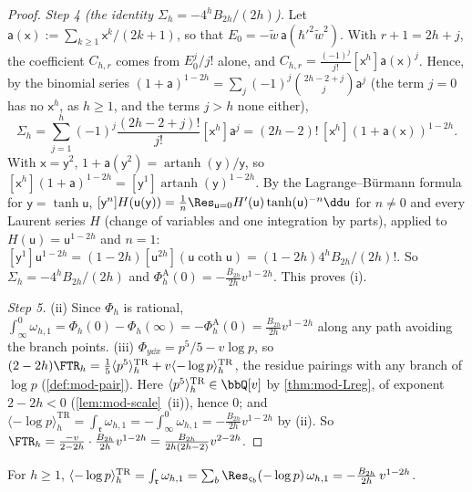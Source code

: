 \begin{proof}
\emph{Step 4 (the identity $\Sigma_h=-4^hB_{2h}/(2h)$).} Let $\mathsf a(\mathsf x):=\sum_{k\geq 1}\mathsf x^k/(2k+1)$, so that $E_0=-\tilde w\,\mathsf a(\hbar'^2\tilde w^2)$. With $r+1=2h+j$, the coefficient $C_{h,r}$ comes from $E_0^j/j!$ alone, and $C_{h,r}=\frac{(-1)^j}{j!}[\mathsf x^h]\mathsf a(\mathsf x)^j$. Hence, by the binomial series $(1+\mathsf a)^{1-2h}=\sum_j(-1)^j\binom{2h-2+j}{j}\mathsf a^j$ (the term $j=0$ has no $\mathsf x^h$, as $h\geq 1$, and the terms $j>h$ none either),
\[
\Sigma_h=\sum_{j=1}^h(-1)^j\frac{(2h-2+j)!}{j!}[\mathsf x^h]\mathsf a^j=(2h-2)!\,[\mathsf x^h](1+\mathsf a(\mathsf x))^{1-2h}.
\]
With $\mathsf x=\mathsf y^2$, $1+\mathsf a(\mathsf y^2)=\operatorname{artanh}(\mathsf y)/\mathsf y$, so $[\mathsf x^h](1+\mathsf a)^{1-2h}=[\mathsf y^{1}]\operatorname{artanh}(\mathsf y)^{1-2h}$. By the Lagrange--B\"urmann formula for $\mathsf y=\tanh\mathsf u$, $[\mathsf y^n]H(\mathsf u(\mathsf y))=\frac1n\Res_{\mathsf u=0}H'(\mathsf u)\tanh(\mathsf u)^{-n}\dd\mathsf u$ for $n\neq 0$ and every Laurent series $H$ (change of variables and one integration by parts), applied to $H(\mathsf u)=\mathsf u^{1-2h}$ and $n=1$: $[\mathsf y^1]\mathsf u^{1-2h}=(1-2h)[\mathsf u^{2h}](\mathsf u\coth\mathsf u)=(1-2h)4^hB_{2h}/(2h)!$. So $\Sigma_h=-4^hB_{2h}/(2h)$ and $\Phi^{\mathrm A}_h(0)=-\frac{B_{2h}}{2h}v^{1-2h}$. This proves (i).

\emph{Step 5.} (ii) Since $\Phi_h$ is rational, $\int_\infty^0\omega_{h,1}=\Phi_h(0)-\Phi_h(\infty)=-\Phi^{\mathrm A}_h(0)=\frac{B_{2h}}{2h}v^{1-2h}$ along any path avoiding the branch points. (iii) $\Phi_{y\dd x}=p^5/5-v\log p$, so $(2-2h)\FTR_h=\frac15\langle p^5\rangle^{\mathrm{TR}}_h+v\langle-\log p\rangle^{\mathrm{TR}}_h$, the residue pairings with any branch of $\log p$ (\cref{def:mod-pair}). Here $\langle p^5\rangle^{\mathrm{TR}}_h\in\bbQ[v]$ by \cref{thm:mod-Lreg}, of exponent $2-2h<0$ (\cref{lem:mod-scale}~(ii)), hence $0$; and $\langle-\log p\rangle^{\mathrm{TR}}_h=\int_{\mathfrak r}\omega_{h,1}=-\int_\infty^0\omega_{h,1}=-\frac{B_{2h}}{2h}v^{1-2h}$ by (ii). So $\FTR_h=\frac{-v}{2-2h}\cdot\frac{B_{2h}}{2h}v^{1-2h}=\frac{B_{2h}}{2h(2h-2)}v^{2-2h}$.
\end{proof}

\begin{lem}
\label{lem:mod-vanper}
For $h\geq 1$, $\langle-\log p\rangle^{\mathrm{TR}}_h=\int_{\mathfrak r}\omega_{h,1}=\sum_b\Res_{\varsigma_b}(-\log p)\,\omega_{h,1}=-\frac{B_{2h}}{2h}\,v^{1-2h}$.
\end{lem}

